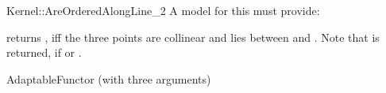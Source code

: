 \begin{ccRefFunctionObjectConcept}{Kernel::AreOrderedAlongLine_2}
A model for this must provide:


         {returns , iff the three points are collinear and 
           lies between  and .
          Note that  is returned, if  or
          .}

\ccRefines
AdaptableFunctor (with three arguments)

\ccSeeAlso
{}  \\

\end{ccRefFunctionObjectConcept}
